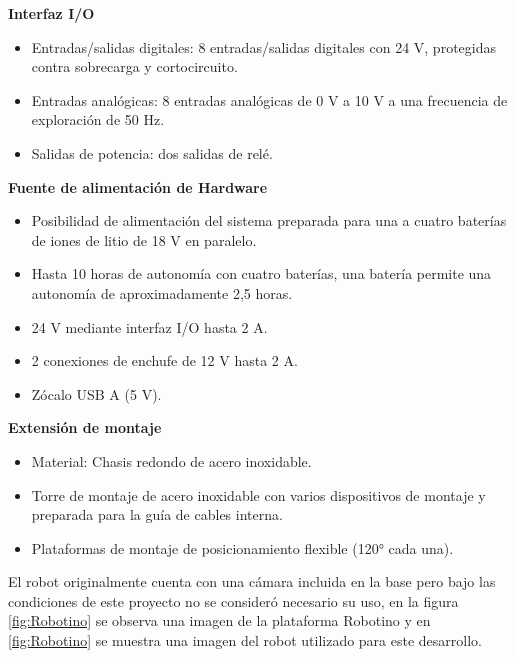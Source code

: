             \phantom{saltodelineaforzado >:D\\}
            
            \textbf{Interfaz I/O}
            \begin{itemize}
                \item Entradas/salidas digitales: 8 entradas/salidas digitales con 24 V, protegidas contra sobrecarga y cortocircuito.
                \item Entradas analógicas: 8 entradas analógicas de 0 V a 10 V a una frecuencia de exploración de 50 Hz.
                \item Salidas de potencia: dos salidas de relé.
            \end{itemize}

            \phantom{saltodelineaforzado >:D\\}
            
            \textbf{Fuente de alimentación de Hardware}
            \begin{itemize}
                \item Posibilidad de alimentación del sistema preparada para una a cuatro baterías de iones de litio de 18 V en paralelo.
                \item Hasta 10 horas de autonomía con cuatro baterías, una batería permite una autonomía de aproximadamente 2,5 horas.
                \item 24 V mediante interfaz I/O hasta 2 A.
                \item 2 conexiones de enchufe de 12 V hasta 2 A.
                \item Zócalo USB A (5 V).
            \end{itemize}

            \phantom{saltodelineaforzado >:D\\}
            
            \textbf{Extensión de montaje}
            \begin{itemize}
                \item Material: Chasis redondo de acero inoxidable.
                \item Torre de montaje de acero inoxidable con varios dispositivos de montaje y preparada para la guía de cables interna.
                \item Plataformas de montaje de posicionamiento flexible (120° cada una).
            \end{itemize}

            El robot originalmente cuenta con una cámara incluida en la base pero bajo las condiciones de este proyecto no se consideró necesario su uso, en la figura \ref{fig:Robotino} se observa una imagen de la plataforma Robotino y en \ref{fig:Robotino} se muestra una imagen del robot utilizado para este desarrollo.

